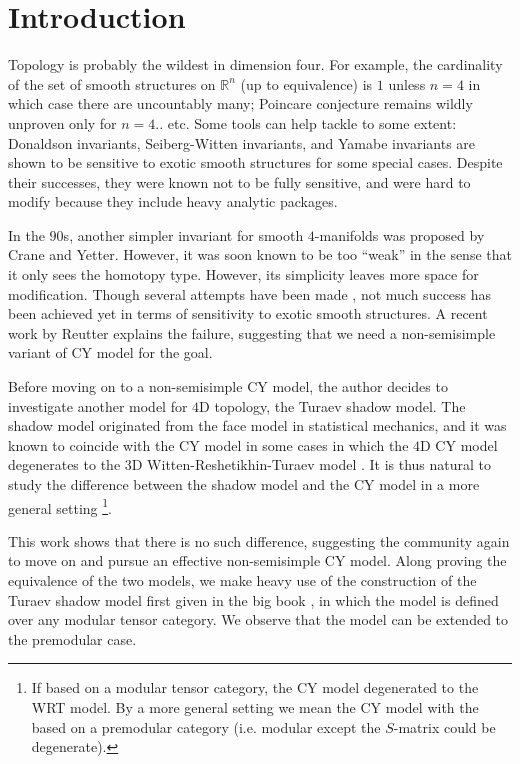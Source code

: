 \section{Introduction}

Topology is probably the wildest in dimension four. For example,
the cardinality of the set of smooth structures on
$\mathbb{R}^{n}$ (up to equivalence) is $1$ unless $n=4$ in which
case there are uncountably many; Poincare conjecture remains
wildly unproven only for $n = 4$.. etc. Some tools can help
tackle to some extent: Donaldson invariants, Seiberg-Witten
invariants, and Yamabe invariants are shown to be sensitive to
exotic smooth structures for some special cases. Despite their
successes, they were known not to be fully sensitive, and were
hard to modify because they include heavy analytic packages.

In the $90$s, another simpler invariant for smooth $4$-manifolds
was proposed by Crane and Yetter. However, it was soon known to
be too ``weak'' in the sense that it only sees the homotopy type.
However, its simplicity leaves more space for modification.
Though several attempts have been made
\cite{barenz/evaluation-crane-yetter}, not much success has been
achieved yet in terms of sensitivity to exotic smooth structures.
A recent work by Reutter \cite{reutter/semisimple} explains the
failure, suggesting that we need a non-semisimple variant of CY
model for the goal.

Before moving on to a non-semisimple CY model, the author decides
to investigate another model for $4$D topology, the Turaev shadow
model. The shadow model originated from the face model in
statistical mechanics, and it was known to coincide with the CY
model in some cases in which the $4$D CY model degenerates to the
$3$D Witten-Reshetikhin-Turaev model
\cite{barrett/observables-in-tv-and-cy}. It is thus natural to
study the difference between the shadow model and the CY model in
a more general setting \footnote{If based on a modular tensor
  category, the CY model degenerated to the WRT model. By a more
  general setting we mean the CY model with the based on a
  premodular category (i.e. modular except the $S$-matrix could
  be degenerate).}.

This work shows that there is no such difference, suggesting the
community again to move on and pursue an effective non-semisimple
CY model. Along proving the equivalence of the two models, we
make heavy use of the construction of the Turaev shadow model
first given in the big book \cite{turaev-qiok-3-manifolds}, in
which the model is defined over any modular tensor category. We
observe that the model can be extended to the premodular case.

